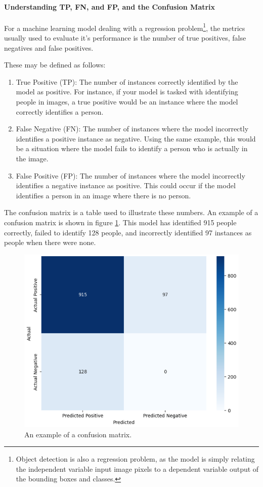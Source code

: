 \paragraph{Understanding TP, FN, and FP, and the Confusion Matrix}
\label{sec:understandingtp}
For a machine learning model dealing with a regression problem\footnote{Object detection is also a regression problem, as the model is simply relating the independent variable input image pixels to a dependent variable output of the bounding boxes and classes.}, the metrics usually used to evaluate it's performance is the number of true positives, false negatives and false positives. 

These may be defined as follows:
\begin{enumerate}
    \item True Positive (TP): The number of instances correctly identified by the model as positive. For instance, if your model is tasked with identifying people in images, a true positive would be an instance where the model correctly identifies a person.
    \item False Negative (FN): The number of instances where the model incorrectly identifies a positive instance as negative. Using the same example, this would be a situation where the model fails to identify a person who is actually in the image.
    \item False Positive (FP): The number of instances where the model incorrectly identifies a negative instance as positive. This could occur if the model identifies a person in an image where there is no person.
\end{enumerate}

The confusion matrix is a table used to illustrate these numbers. An example of a confusion matrix is shown in figure \ref{fig:confusion_matrix}. This model has identified 915 people correctly, failed to identify 128 people, and incorrectly identified 97 instances as people when there were none.

\begin{figure}
    \centering
    \includegraphics[width=0.5\linewidth]{Images/Diagrams/confusion_matrix.png}
    \caption{An example of a confusion matrix.}
    \label{fig:confusion_matrix}
\end{figure}

